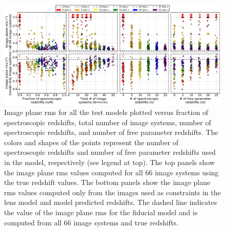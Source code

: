 \begin{figure}
\center
\includegraphics[width=\textwidth]{Chap3/c3f3.pdf}
\caption[Image plane rms vs. spec-z fraction of test models]{Image plane rms for all the test models plotted versus fraction of spectroscopic redshifts, total number of image systems, number of spectroscopic redshifts, and number of free parameter redshifts. The colors and shapes of the points represent the number of spectroscopic redshifts and number of free parameter redshifts used in the model, respectively (see legend at top). The top panels show the image plane rms values computed for all 66 image systems using the true redshift values. The bottom panels show the image plane rms values computed only from the images used as constraints in the lens model and model predicted redshifts.  The dashed line indicates the value of the image plane rms for the fiducial model and is computed from all 66 image systems and true redshifts.}
\label{chap3:fig:rms}
\end{figure}

